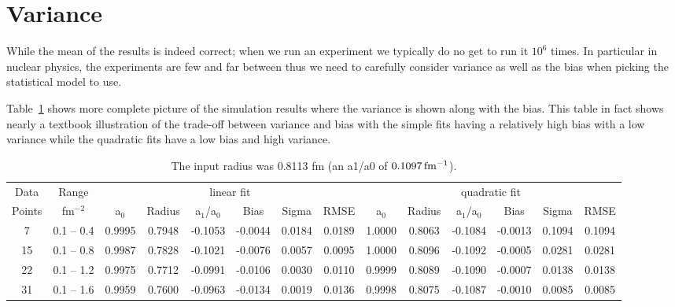 \documentclass[10pt,aps,prc,twocolumn]{revtex4-1}
\begin{document}
\section{Variance}

While the mean of the results is indeed correct; when we run an experiment we typically do no get to run it $10^6$ times.
In particular in nuclear physics, the experiments are few and far between thus we need to carefully consider variance as
well as the bias when picking the statistical model to use.

Table~\ref{fulltable} shows more complete picture of the simulation results where the variance is shown along with the bias.
This table in fact shows nearly a textbook illustration of the trade-off between variance and bias with the simple fits
having a relatively high bias with a low variance while the quadratic fits have a low bias and high variance.

\begin{table}
\caption{The input radius was 0.8113 fm (an a1/a0 of $\unit[0.1097]{fm^{-1}}$).}
\begin{tabular}{cc|cccccc|cccccc} \hline
Data   & Range     & \multicolumn{6}{c|}{linear fit}                       & \multicolumn{6}{c}{quadratic fit}                    \\ 
Points & fm$^{-2}$ &   a$_0$  & Radius&  a$_1$/a$_0$ &  Bias  & Sigma &  RMSE  &   a$_0$  & Radius& a$_1$/a$_0$  &  Bias  & Sigma &  RMSE \\  \hline
7      & 0.1 -- 0.4 & 0.9995& 0.7948& -0.1053& -0.0044& 0.0184& 0.0189 & 1.0000& 0.8063& -0.1084& -0.0013& 0.1094& 0.1094\\
15     & 0.1 -- 0.8 & 0.9987& 0.7828& -0.1021& -0.0076& 0.0057& 0.0095 & 1.0000& 0.8096& -0.1092& -0.0005& 0.0281& 0.0281\\
22     & 0.1 -- 1.2 & 0.9975& 0.7712& -0.0991& -0.0106& 0.0030& 0.0110 & 0.9999& 0.8089& -0.1090& -0.0007& 0.0138& 0.0138\\
31     & 0.1 -- 1.6 & 0.9959& 0.7600& -0.0963& -0.0134& 0.0019& 0.0136 & 0.9998& 0.8075& -0.1087& -0.0010& 0.0085& 0.0085\\ \hline
\end{tabular}
\label{fulltable}
\end{table}
\end{document}
